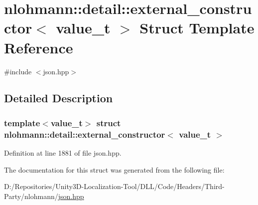 \hypertarget{structnlohmann_1_1detail_1_1external__constructor}{}\section{nlohmann\+::detail\+::external\+\_\+constructor$<$ value\+\_\+t $>$ Struct Template Reference}
\label{structnlohmann_1_1detail_1_1external__constructor}


{\ttfamily \#include $<$json.\+hpp$>$}



\subsection{Detailed Description}
\subsubsection*{template$<$value\+\_\+t$>$\newline
struct nlohmann\+::detail\+::external\+\_\+constructor$<$ value\+\_\+t $>$}



Definition at line 1881 of file json.\+hpp.



The documentation for this struct was generated from the following file\+:\begin{DoxyCompactItemize}
\item 
D\+:/\+Repositories/\+Unity3\+D-\/\+Localization-\/\+Tool/\+D\+L\+L/\+Code/\+Headers/\+Third-\/\+Party/nlohmann/\mbox{\hyperlink{json_8hpp}{json.\+hpp}}\end{DoxyCompactItemize}
